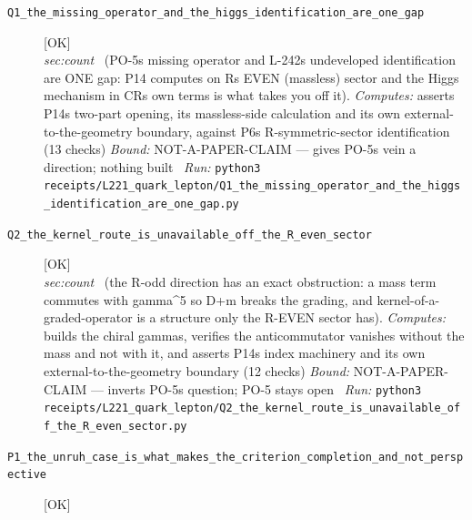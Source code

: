 \begin{description}
\item[\label{rcpt:Q1_the_missing_operator_and_the_higgs_identification_are_one_gap}\texttt{Q1\_the\_missing\_operator\_and\_the\_higgs\_identification\_are\_one\_gap}]\hfill\textsf{[OK]}\\
\textit{sec:count} \ (PO-5s missing operator and L-242s undeveloped identification are ONE gap: P14 computes on Rs EVEN (massless) sector and the Higgs mechanism in CRs own terms is what takes you off it). 
\emph{Computes:} asserts P14s two-part opening, its massless-side calculation and its own external-to-the-geometry boundary, against P6s R-symmetric-sector identification (13 checks)
 \emph{Bound:} NOT-A-PAPER-CLAIM --- gives PO-5s vein a direction; nothing built
\ \emph{Run:} \texttt{python3 receipts/L221\_quark\_lepton/Q1\_the\_missing\_operator\_and\_the\_higgs\_identification\_are\_one\_gap.py}
\item[\label{rcpt:Q2_the_kernel_route_is_unavailable_off_the_R_even_sector}\texttt{Q2\_the\_kernel\_route\_is\_unavailable\_off\_the\_R\_even\_sector}]\hfill\textsf{[OK]}\\
\textit{sec:count} \ (the R-odd direction has an exact obstruction: a mass term commutes with gamma\textasciicircum{}5 so D+m breaks the grading, and kernel-of-a-graded-operator is a structure only the R-EVEN sector has). 
\emph{Computes:} builds the chiral gammas, verifies the anticommutator vanishes without the mass and not with it, and asserts P14s index machinery and its own external-to-the-geometry boundary (12 checks)
 \emph{Bound:} NOT-A-PAPER-CLAIM --- inverts PO-5s question; PO-5 stays open
\ \emph{Run:} \texttt{python3 receipts/L221\_quark\_lepton/Q2\_the\_kernel\_route\_is\_unavailable\_off\_the\_R\_even\_sector.py}
\item[\label{rcpt:P1_the_unruh_case_is_what_makes_the_criterion_completion_and_not_perspective}\texttt{P1\_the\_unruh\_case\_is\_what\_makes\_the\_criterion\_completion\_and\_not\_perspective}]\hfill\textsf{[OK]}\\

\end{description}
